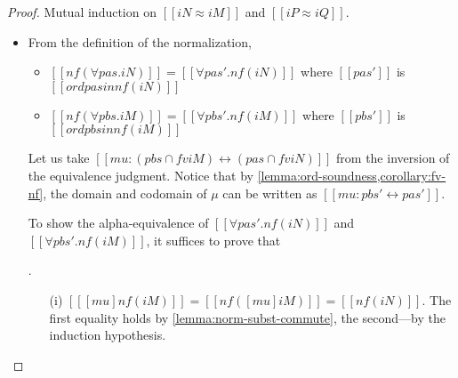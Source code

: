 \begin{proof}
  Mutual induction on $[[iN ≈ iM]]$ and $[[iP ≈ iQ]]$.
  \begin{itemize}
  \item {\nameref{\ottdruleEOneForallLabel}} 

    From the definition of the normalization,
    \begin{itemize}
      \item $[[nf(∀pas.iN)]] = [[∀pas'.nf(iN)]]$ where $[[pas']]$ is $[[ord pas in nf(iN)]]$
      \item $[[nf(∀pbs.iM)]] = [[∀pbs'.nf(iM)]]$ where $[[pbs']]$ is $[[ord pbs in nf(iM)]]$
    \end{itemize}
    Let us take $[[mu : (pbs ∩ fv iM) ↔ (pas ∩ fv iN)]]$ from the
    inversion of the equivalence judgment. Notice that by
    \cref{lemma:ord-soundness,corollary:fv-nf}, the domain and codomain of $\mu$ can be written
    as $[[mu : pbs' ↔ pas']]$.
    
    To show the alpha-equivalence of $[[∀pas'.nf(iN)]]$ and $[[∀pbs'.nf(iM)]]$,
    it suffices to prove that
    .
    
    \begin{enumerate}
    \item[(i)] $[[ [mu] nf(iM) ]] = [[nf([mu]iM)]] = [[nf(iN)]]$.
      The first equality holds by \cref{lemma:norm-subst-commute}, the second---by the induction hypothesis.


\end{enumerate}
\end{itemize}
\end{proof}
